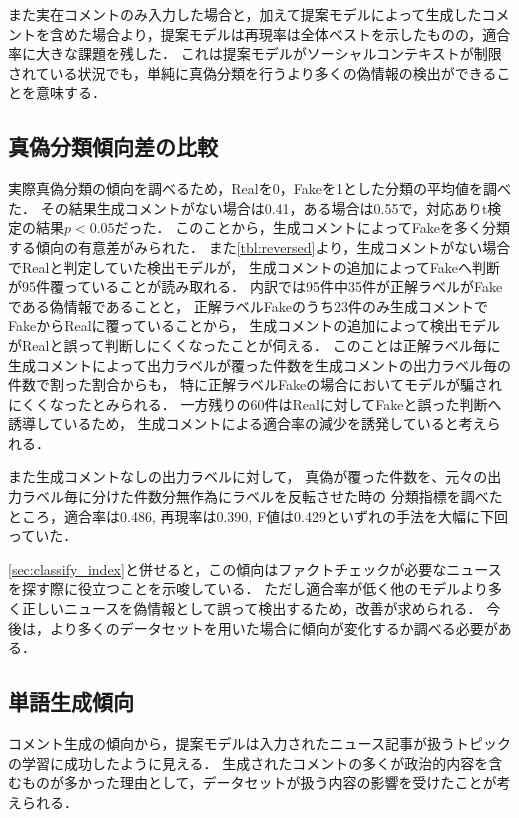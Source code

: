 また実在コメントのみ入力した場合と，加えて提案モデルによって生成したコメントを含めた場合より，提案モデルは再現率は全体ベストを示したものの，適合率に大きな課題を残した．
これは提案モデルがソーシャルコンテキストが制限されている状況でも，単純に真偽分類を行うより多くの偽情報の検出ができることを意味する．

\subsection{真偽分類傾向差の比較}
\label{sec:classify_trend}
実際真偽分類の傾向を調べるため，Realを0，Fakeを1とした分類の平均値を調べた．
その結果生成コメントがない場合は0.41，ある場合は0.55で，対応ありt検定の結果$p<0.05$だった．
このことから，生成コメントによってFakeを多く分類する傾向の有意差がみられた．
また\cref{tbl:reversed}より，生成コメントがない場合でRealと判定していた検出モデルが，
生成コメントの追加によってFakeへ判断が95件覆っていることが読み取れる．
内訳では95件中35件が正解ラベルがFakeである偽情報であることと，
正解ラベルFakeのうち23件のみ生成コメントでFakeからRealに覆っていることから，
生成コメントの追加によって検出モデルがRealと誤って判断しにくくなったことが伺える．
このことは正解ラベル毎に生成コメントによって出力ラベルが覆った件数を生成コメントの出力ラベル毎の件数で割った割合からも，
特に正解ラベルFakeの場合においてモデルが騙されにくくなったとみられる．
一方残りの60件はRealに対してFakeと誤った判断へ誘導しているため，
生成コメントによる適合率の減少を誘発していると考えられる．

また生成コメントなしの出力ラベルに対して，
真偽が覆った件数を、元々の出力ラベル毎に分けた件数分無作為にラベルを反転させた時の
分類指標を調べたところ，適合率は0.486, 再現率は0.390, F値は0.429といずれの手法を大幅に下回っていた．

\cref{sec:classify_index}と併せると，この傾向はファクトチェックが必要なニュースを探す際に役立つことを示唆している．
ただし適合率が低く他のモデルより多く正しいニュースを偽情報として誤って検出するため，改善が求められる．
今後は，より多くのデータセットを用いた場合に傾向が変化するか調べる必要がある．

\subsection{単語生成傾向}
コメント生成の傾向から，提案モデルは入力されたニュース記事が扱うトピックの学習に成功したように見える．
生成されたコメントの多くが政治的内容を含むものが多かった理由として，データセットが扱う内容の影響を受けたことが考えられる．

